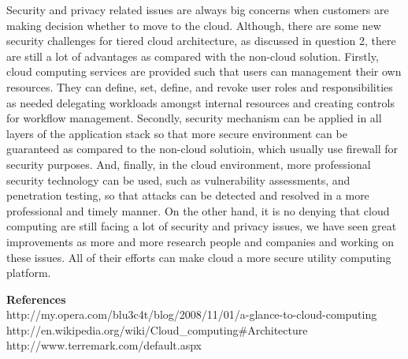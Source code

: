 \documentclass{article}
\begin{document}
\begin{enumerate}
Security and privacy related issues are always big concerns when
customers are making decision whether to move to the cloud. Although,
there are some new security challenges for tiered cloud architecture,
as discussed in question 2, there are still a lot of advantages as
compared with the non-cloud solution. Firstly, cloud computing
services are provided such that users can management their own
resources. They can define, set, define, and revoke user roles and
responsibilities as needed delegating workloads amongst internal
resources and creating controls for workflow management. Secondly,
security mechanism can be applied in all layers of the application
stack so that more secure environment can be guaranteed as compared to
the non-cloud solutioin, which usually use firewall for security
purposes. And, finally, in the cloud environment, more professional
security technology can be used, such as vulnerability assessments,
and penetration testing, so that attacks can be detected and resolved
in a more professional and timely manner. On the other hand, it is no
denying that cloud computing are still facing a lot of security and
privacy issues, we have seen great improvements as more and more
research people and companies and working on these issues. All of
their efforts can make cloud a more secure utility computing platform.

\textbf{References} \\
http://my.opera.com/blu3c4t/blog/2008/11/01/a-glance-to-cloud-computing \\
http://en.wikipedia.org/wiki/Cloud\_computing\#Architecture \\
http://www.terremark.com/default.aspx

\end{enumerate}
\end{document}
